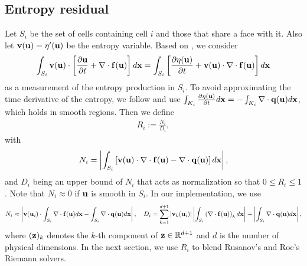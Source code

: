 \documentclass[preprint, 11pt]{article}
\newcommand{\bff}{{\bf f}}
\newcommand{\bfu}{{\bf u}}
\newcommand{\bfv}{{\bf v}}
\newcommand{\bfq}{{\bf q}}
\newcommand{\bfx}{{\bf x}}
\begin{document}
\subsection{Entropy residual}
Let $S_i$ be the set of cells containing cell $i$ and those that share a face with it. 
Also let $\bfv(\bfu)=\eta^\prime(\bfu)$ be the entropy variable. 
Based on \cite{guermond2011entropy}, we consider 
\begin{align}\label{ent_residual}
  \int_{S_i} \bfv(\bfu) \cdot \left[ \frac{\partial \bfu}{\partial t} + \nabla\cdot \bff(\bfu)\right]d\bfx
  =\int_{S_i} \left[\frac{\partial \eta(\bfu)}{\partial t} + \bfv(\bfu) \cdot \nabla\cdot \bff(\bfu)\right] d\bfx
\end{align}
as a measurement of the entropy production in $S_i$. 
To avoid approximating the time derivative of the entropy, we follow 
\cite{guermond2018second, guermond2018well} and use 
$\int_{K_i} \frac{\partial\eta(\bfu)}{\partial t}d\bfx=-\int_{K_i} \nabla\cdot\bfq(\bfu) d\bfx$, 
which holds in smooth regions. Then we define 
\begin{align}\label{Ri}
  R_i := \frac{N_i}{D_i}, 
\end{align}
with
\begin{align*}
  N_i=
  \left|\int_{S_i} \left[\bfv(\bfu) \cdot \nabla\cdot \bff(\bfu) - \nabla\cdot\bfq(\bfu) \right] d\bfx\right|,
\end{align*}
and $D_i$ being an upper bound of $N_i$ that acts as normalization so that $0\leq R_i\leq 1$.
Note that $N_i\approx 0$ if $\bfu$ is smooth in $S_i$. 
In our implementation, we use
\begin{align*}
  N_i\approx \left|\bfv(\bfu_i)\cdot \int_{S_i}\nabla\cdot \bff(\bfu)d\bfx 
  -\int_{S_i}\nabla\cdot\bfq(\bfu) d\bfx\right|,
  \quad 
  D_i = \sum_{k=1}^{d+1}|\bfv_k(\bfu_i)|\left|\int_{S_i}\left(\nabla\cdot\bff(\bfu)\right)_kd\bfx\right|
  +\left|\int_{S_i}\nabla\cdot\bfq(\bfu)d\bfx\right|,
\end{align*}
where $({\bf z})_k$ denotes the $k$-th component of ${\bf z}\in\mathbb{R}^{d+1}$ and $d$ is the number of physical 
dimensions. In the next section, we use $R_i$ to blend Rusanov's and Roe's Riemann solvers. 
\end{document}
